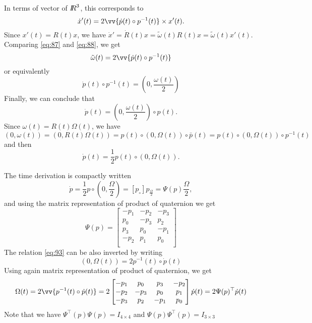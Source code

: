 In terms of vector of $\mbox{\rm $I\!\!R$}^3$, this corresponds to
\begin{equation}
  \label{eq:88}
  \dot x'(t) = 2 \vv{ \dot p(t) \circ p^{-1}(t) } \times x'(t).
\end{equation}
Since $x'(t) = R(t) x$, we have $\dot x' = \dot R(t) x = \tilde \omega(t) R(t) x  = \tilde \omega(t) x'(t) $. Comparing \eqref{eq:87} and \eqref{eq:88}, we get
\begin{equation}
  \label{eq:89}
  \tilde \omega(t)  = 2 \vv{ \dot p(t) \circ p^{-1}(t) } 
\end{equation}
or equivalently
\begin{equation}
  \dot p(t) \circ p^{-1}(t) = (0, \frac{\omega(t)}{2} )
  \label{eq:90}
\end{equation}
Finally, we can conclude that
\begin{equation}
  \label{eq:91}
  \dot p(t) = (0, \frac{\omega(t)}2 ) \circ p(t).
\end{equation}
Since $\omega(t)=R(t)\Omega(t)$, we have
\begin{equation}
  \label{eq:92}
  (0, \omega(t) ) = (0, R(t) \Omega(t) ) = p(t) \circ (0, \Omega(t) ) \circ \bar p(t) = p(t) \circ (0, \Omega(t) ) \circ  p^{-1}(t)
\end{equation}
and then
\begin{equation}
  \label{eq:93}
  \dot p(t) =\frac 1 2 p(t) \circ(0, \Omega(t) ) .
\end{equation}

The time derivation is compactly written
\begin{equation}
  \label{eq:94}
  \dot p = \frac  1 2 p  \circ(0, \frac\Omega 2 ) =  [p_\circ] p_{\frac \Omega 2} = \Psi(p)\frac \Omega 2,
\end{equation}
and using the matrix representation of product of  quaternion
we get
\begin{equation}
  \label{eq:95}
  \Psi(p) =  \begin{bmatrix}
    -p_1 & -p_2 & -p_3 \\
    p_0 & -p_3 & p_2 \\
    p_3 & p_0 & -p_1 \\
    -p_2 & p_1 & p_0 \\
  \end{bmatrix}
\end{equation}
The relation \eqref{eq:93} can be also inverted by writing
\begin{equation}
  \label{eq:96}
   (0, \Omega(t) ) = 2 p^{-1}(t) \circ \dot p(t)
\end{equation}
Using again  matrix representation of product of  quaternion, we get 
\begin{equation}
  \label{eq:97}
  \Omega(t)  = 2 \vv{p^{-1}(t) \circ \dot p(t)}  = 2  \begin{bmatrix}
    -p_1 & p_0 & p_3 & -p_2 \\
    -p_2 & -p_3 & p_0 & p_1 \\
    -p_3 & p_2 & -p_1  & p_0\\
  \end{bmatrix}\dot p(t) = 2 \Psi(p)^\top \dot p(t)
\end{equation}
Note that we have $\Psi^\top(p)\Psi(p)= I_{4\times 4 }$ and  $\Psi(p)\Psi^\top(p)= I_{3\times 3 }$

